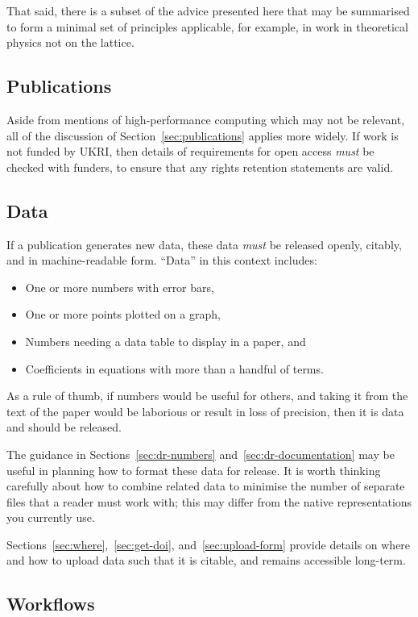\documentclass{article}
\newcommand\rfcword[1]{\emph{#1}\xspace}
\newcommand\must{\rfcword{must}}
\begin{document}
That said,
there is a subset of the advice presented here that may be summarised
to form a minimal set of principles applicable,
for example,
in work in theoretical physics not on the lattice.

\subsection{Publications}

Aside from mentions of high-performance computing which may not be relevant,
all of the discussion of Section~\ref{sec:publications} applies more widely.
If work is not funded by UKRI,
then details of requirements for open access \must be checked with funders,
to ensure that any rights retention statements are valid.

\subsection{Data}

If a publication generates new data,
these data \must be released openly, citably, and in machine-readable form.
``Data'' in this context includes:
\begin{itemize}
  \item One or more numbers with error bars,
  \item One or more points plotted on a graph,
  \item Numbers needing a data table to display in a paper, and
  \item Coefficients in equations with more than a handful of terms.
\end{itemize}
As a rule of thumb,
if numbers would be useful for others,
and taking it from the text of the paper would be laborious
or result in loss of precision,
then it is data and should be released.

The guidance in Sections~\ref{sec:dr-numbers} and~\ref{sec:dr-documentation}
may be useful in planning how to format these data for release.
It is worth thinking carefully about how to combine related data
to minimise the number of separate files that a reader must work with;
this may differ from the native representations you currently use.

Sections~\ref{sec:where},~\ref{sec:get-doi}, and~\ref{sec:upload-form}
provide details on where and how to upload data such that it is citable,
and remains accessible long-term.

\subsection{Workflows}
\end{document}

